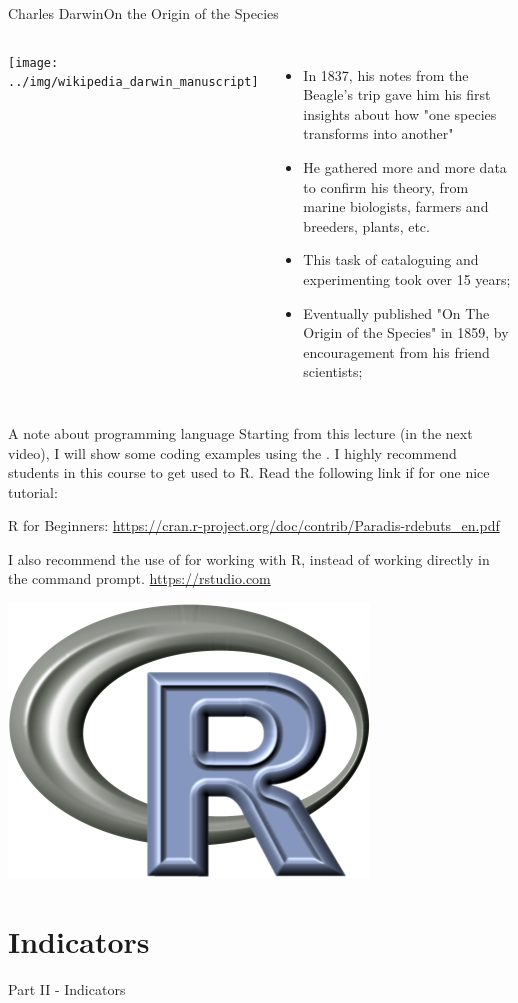 \begin{frame}{Charles Darwin}{On the Origin of the Species}
  \begin{columns}
    \texttt{[image: ../img/wikipedia\_darwin\_manuscript]}
  \begin{itemize}
    \item In 1837, his notes from the Beagle's trip gave him his first insights about how "one species transforms into another"
    \item He gathered more and more data to confirm his theory, from marine biologists, farmers and breeders, plants, etc.
    \item This task of cataloguing and experimenting took over 15 years;
    \item Eventually published "On The Origin of the Species" in 1859, by encouragement from his friend scientists;
  \end{itemize}
  \end{columns}
\end{frame}

\begin{frame}{A note about programming language}
  Starting from this lecture (in the next video), I will show some coding examples using the . I highly recommend students in this course to get used to R. Read the following link if for one nice tutorial:\bigskip

  R for Beginners: \url{https://cran.r-project.org/doc/contrib/Paradis-rdebuts_en.pdf}\bigskip

  I also recommend the use of  for working with R, instead of working directly in the command prompt. \url{https://rstudio.com}
  \vfill

  \hfill\includegraphics[width=.2\textwidth]{../img/Rlogo}
\end{frame}


\section{Indicators}
\begin{frame}
  \begin{center}
    Part II - Indicators
  \end{center}
\end{frame}

